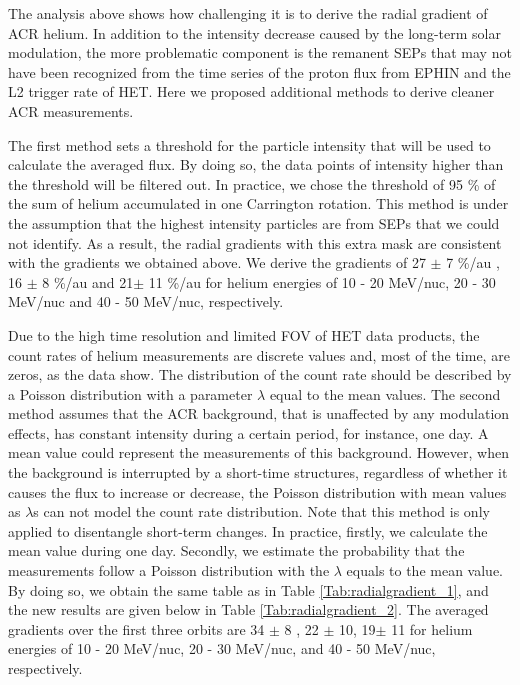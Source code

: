The analysis above shows how challenging it is to derive the radial gradient of \ac{ACR} helium. In addition to the intensity decrease caused by the long-term solar modulation, the more problematic component is the remanent \acp{SEP} that may not have been recognized from the time series of the proton flux from \ac{EPHIN} and the L2 trigger rate of \ac{HET}. Here we proposed additional methods to derive cleaner \ac{ACR} measurements.

The first method sets a threshold for the particle intensity that will be used to calculate the averaged flux. By doing so, the data points of intensity higher than the threshold will be filtered out. In practice, we chose the threshold of 95 \% of the sum of helium accumulated in one Carrington rotation. This method is under the assumption that the highest intensity particles are from \acp{SEP} that we could not identify. As a result, the radial gradients with this extra mask are consistent with the gradients we obtained above. We derive the gradients of 27 $\pm$ 7 \%/au , 16 $\pm$ 8 \%/au and 21$\pm$ 11 \%/au for helium energies of 10 - 20 MeV/nuc, 20 - 30 MeV/nuc and 40 - 50 MeV/nuc, respectively. 


Due to the high time resolution and limited \ac{FOV} of \ac{HET} data products, the count rates of helium measurements are discrete values and, most of the time, are zeros, as the data show. The distribution of the count rate should be described by a Poisson distribution with a parameter $\lambda$ equal to the mean values. 
The second method assumes that the \ac{ACR} background, that is unaffected by any modulation effects, has constant intensity during a certain period, for instance, one day. A mean value could represent the measurements of this background. However, when the background is interrupted by a short-time structures, regardless of whether it causes the flux to increase or decrease, the Poisson distribution with mean values as $\lambda$s can not model the count rate distribution. Note that this method is only applied to disentangle short-term changes. 
In practice, firstly, we calculate the mean value during one day. Secondly, we estimate the probability that the measurements follow a Poisson distribution with the $\lambda$ equals to the mean value.
By doing so, we obtain the same table as in Table \ref{Tab:radialgradient_1}, and the new results are given below in Table \ref{Tab:radialgradient_2}.
The averaged gradients over the first three orbits are 34 $\pm$ 8 , 22 $\pm$ 10, 19$\pm$ 11 for helium energies of 10 - 20 MeV/nuc, 20 - 30 MeV/nuc, and 40 - 50 MeV/nuc, respectively. 



